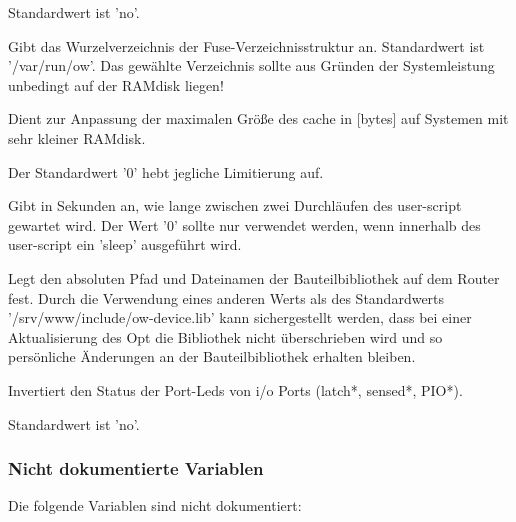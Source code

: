 \begin{description}
Standardwert ist 'no'.

 Gibt das Wurzelverzeichnis der Fuse-Verzeichnisstruktur
an. Standardwert ist '/var/run/ow'. Das gewählte Verzeichnis
sollte aus Gründen der Systemleistung unbedingt
auf der RAMdisk liegen!

 Dient zur Anpassung der maximalen Größe des cache in
[bytes] auf Systemen mit sehr kleiner RAMdisk.

 Der Standardwert '0' hebt jegliche Limitierung auf.

 Gibt in Sekunden an, wie lange zwischen zwei Durchläufen
des user-script gewartet wird. Der Wert '0' sollte nur
verwendet werden, wenn innerhalb des user-script ein
'sleep' ausgeführt wird.

 Legt den absoluten Pfad und Dateinamen der Bauteilbibliothek
auf dem Router fest. Durch die Verwendung eines anderen Werts als des Standardwerts
'/srv/www/include/ow-device.lib' kann sichergestellt werden,
dass bei einer Aktualisierung des Opt die Bibliothek
nicht überschrieben wird und so persönliche Änderungen
an der Bauteilbibliothek erhalten bleiben.

 Invertiert den Status der Port-Leds von i/o Ports (latch*,
sensed*, PIO*).

Standardwert ist 'no'.
\end{description}

\subsubsection{Nicht dokumentierte Variablen}

Die folgende Variablen sind nicht dokumentiert:
\begin{description}


\end{description}

